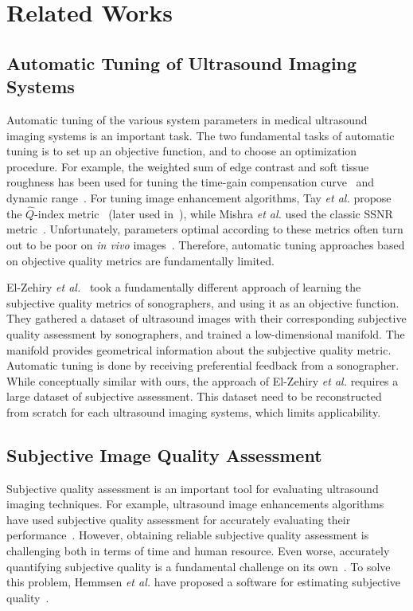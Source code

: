 
\section{Related Works}\label{section:relatedworks}
\subsection{Automatic Tuning of Ultrasound Imaging Systems}
Automatic tuning of the various system parameters in medical ultrasound imaging systems is an important task.
The two fundamental tasks of automatic tuning is to set up an objective function, and to choose an optimization procedure.
For example, the weighted sum of edge contrast and soft tissue roughness has been used for tuning the time-gain compensation curve~\cite{lee_automatic_2006} and dynamic range~\cite{lee_automatic_2015}.
For tuning image enhancement algorithms, Tay \textit{et al.} propose the \(\widehat{Q}\)-index metric~\cite{tay_ultrasound_2006} (later used in~\cite{coupe_nonlocal_2009, ramos-llorden_anisotropic_2015}), while Mishra \textit{et al.} used the classic SSNR metric~\cite{mishra_edge_2018}.
Unfortunately, parameters optimal according to these metrics often turn out to be poor on \textit{in vivo} images~\cite{ramos-llorden_anisotropic_2015}.
Therefore, automatic tuning approaches based on objective quality metrics are fundamentally limited.

El-Zehiry \textit{et al.}~\cite{el-zehiry_learning_2013} took a fundamentally different approach of learning the subjective quality metrics of sonographers, and using it as an objective function.
They gathered a dataset of ultrasound images with their corresponding subjective quality assessment by sonographers, and trained a low-dimensional manifold.
The manifold provides geometrical information about the subjective quality metric.
Automatic tuning is done by receiving preferential feedback from a sonographer.
While conceptually similar with ours, the approach of El-Zehiry \textit{et al.} requires a large dataset of subjective assessment.
This dataset need to be reconstructed from scratch for each ultrasound imaging systems, which limits applicability.

\subsection{Subjective Image Quality Assessment}
Subjective quality assessment is an important tool for evaluating ultrasound imaging techniques.
For example, ultrasound image enhancements algorithms have used subjective quality assessment for accurately evaluating their performance~\cite{loizou_quality_2006, hemmsen_ultrasound_2010, wong_monte_2012, kang_new_2016, mishra_edge_2018}.
However, obtaining reliable subjective quality assessment is challenging both in terms of time and human resource.
Even worse, accurately quantifying subjective quality is a fundamental challenge on its own~\cite{streijl_mean_2016}.
To solve this problem, Hemmsen \textit{et al.} have proposed a software for estimating subjective quality~\cite{hemmsen_ultrasound_2010}.

